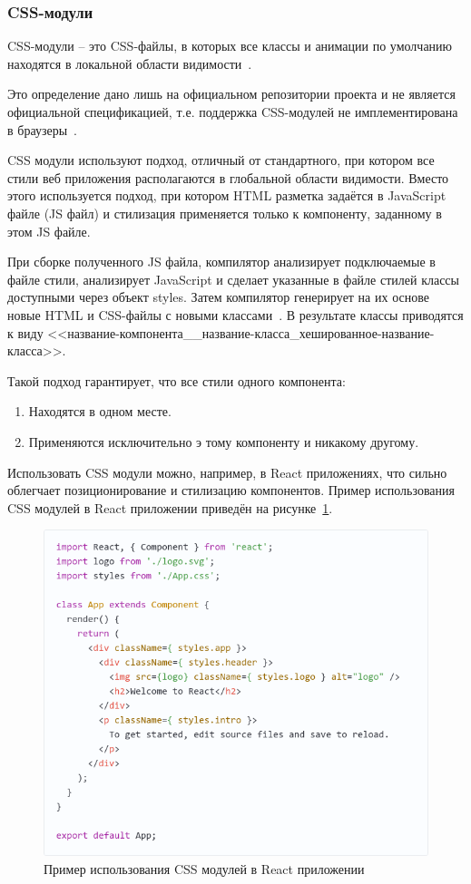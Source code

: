 \subsubsection{CSS-модули}

CSS-модули -- это CSS-файлы, в которых все классы и анимации по умолчанию находятся в локальной области видимости~\cite{css_modules}.

Это определение дано лишь на официальном репозитории проекта и не является официальной спецификацией, т.е. поддержка CSS-модулей не имплементирована в браузеры~\cite{frontenderMagazine}.

CSS модули используют подход, отличный от стандартного, при котором все стили веб приложения располагаются в глобальной области видимости. Вместо этого используется подход, при котором HTML разметка задаётся в JavaScript файле (JS файл) и стилизация применяется только к компоненту, заданному в этом JS файле.

При сборке полученного JS файла, компилятор анализирует подключаемые в файле стили, анализирует JavaScript и сделает указанные в файле стилей классы доступными через объект styles. Затем компилятор генерирует на их основе новые HTML и CSS-файлы с новыми классами~\cite{frontenderMagazine}. В результате классы приводятся к виду <<название-компонента\_\_название-класса\_хешированное-название-класса>>.

Такой подход гарантирует, что все стили одного компонента:

\begin{enumerate}
  \item Находятся в одном месте.
  \item Применяются исключительно э тому компоненту и никакому другому.
\end{enumerate}

Использовать CSS модули можно, например, в React приложениях, что сильно облегчает позиционирование и стилизацию компонентов. Пример использования CSS модулей в React приложении приведён на рисунке~\ref{img:cssModule__react}.

\begin{figure}[H]
  \centering
  \includegraphics[height=0.4\textheight]{assets/images/theoretical2/css-module-react.png}
  \caption{Пример использования CSS модулей в React приложении}
  \label{img:cssModule__react}
\end{figure}